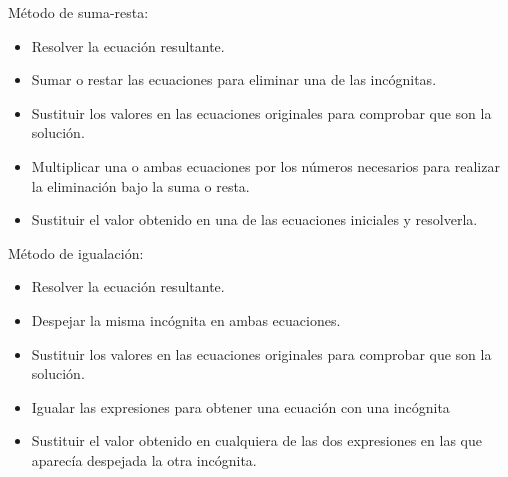\documentclass[12pt,addpoints]{repaso}
\begin{document}
\begin{questions}
{\begin{choices}
            \choice M\'etodo de suma-resta:
            \begin{itemize}
                \item[\rule{1cm}{0.2mm}] Resolver la ecuaci\'on resultante.
                \item[\rule{1cm}{0.2mm}] Sumar o restar las ecuaciones para eliminar una de las inc\'ognitas.
                \item[\rule{1cm}{0.2mm}] Sustituir los valores en las ecuaciones originales para comprobar que son la soluci\'on.
                \item[\rule{1cm}{0.2mm}] Multiplicar una o ambas ecuaciones por los n\'umeros necesarios para realizar la eliminaci\'on bajo la suma o resta.
                \item[\rule{1cm}{0.2mm}] Sustituir el valor obtenido en una de las ecuaciones iniciales y resolverla.
            \end{itemize}


            \choice M\'etodo de igualaci\'on:
            \begin{itemize}
                \item[\rule{1cm}{0.2mm}] Resolver la ecuaci\'on resultante.
                \item[\rule{1cm}{0.2mm}] Despejar la misma inc\'ognita en ambas ecuaciones.
                \item[\rule{1cm}{0.2mm}] Sustituir los valores en las ecuaciones originales para comprobar que son la soluci\'on.
                \item[\rule{1cm}{0.2mm}] Igualar las expresiones para obtener una ecuaci\'on con una inc\'ognita
                \item[\rule{1cm}{0.2mm}] Sustituir el valor obtenido en cualquiera de las dos expresiones en las que aparec\'ia despejada la otra inc\'ognita.
            \end{itemize}
        \end{choices}
    }


\end{questions}
\end{document}
